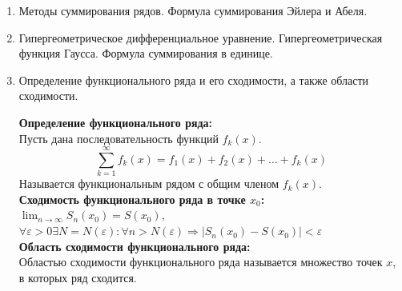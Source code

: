 \documentclass[a4paper, 12pt]{article}
\begin{document}
\begin{enumerate}
\begin{mdframed}
		      \textbf{Признак Гаусса:} \\
		      $a_n > 0, \varepsilon > 0$ и $\frac{a_n}{a_{n+1}} = \lambda + \frac{M}{n}+O \left( \frac{1}{n} + \varepsilon \right)$
		      \begin{itemize}
			      \item Если $\lambda > 1$, то ряд $\sum_{n=1}^{\infty} a_n$ сходится.
			      \item Если $\lambda < 1$, то ряд $\sum_{n=1}^{\infty} a_n$ расходится.
			      \item Если $\lambda = 1$, то:
			            \begin{itemize}
				            \item Если $M > 1$, то ряд $\sum_{n=1}^{\infty} a_n$ сходится.
				            \item Если $M \le  1$, то ряд $\sum_{n=1}^{\infty} a_n$ расходится.
			            \end{itemize}
		      \end{itemize}
	      \end{mdframed}
	\item Методы суммирования рядов. Формула суммирования Эйлера и Абеля. \\
	\item Гипергеометрическое дифференциальное уравнение. Гипергеометрическая функция Гаусса. Формула суммирования в единице. \\
	\item Определение функционального ряда и его сходимости, а также области сходимости. \\
	      \begin{mdframed}
		      \textbf{Определение функционального ряда:} \\
		      Пусть дана последовательность функций $f_k(x)$. \\
		      \[
			      \sum_{k=1}^{\infty} f_k(x) = f_1(x) + f_2(x) + \ldots + f_k(x)
		      \]
		      Называется функциональным рядом с общим членом $f_k(x)$. \\
		      \textbf{Сходимость функционального ряда в точке $x_0$:} \\
		      $\lim_{n \to \infty} S_n(x_0) = S(x_0)$, \\
		      $\forall \varepsilon > 0 \exists N = N(\varepsilon): \forall n > N(\varepsilon) \Rightarrow |S_n(x_0) - S(x_0)| < \varepsilon$ \\
		      \textbf{Область сходимости функционального ряда:} \\
		      Областью сходимости функционального ряда называется множество точек $x$, в которых ряд сходится.

\end{mdframed}
\end{enumerate}
\end{document}
